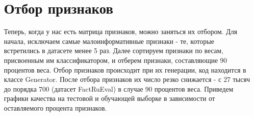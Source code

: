 \section{Отбор признаков}

Теперь, когда у нас есть матрица признаков, можно заняться их отбором. Для начала, исключаем самые малоинформативные признаки - те, которые встретились в датасете менее 5 раз. Далее сортируем признаки по весам, присвоенным им классификатором, и отберем признаки, составляющие 90 процентов веса. Отбор признаков происходит при их генерации, код находится в классе Generator. После отбора признаков их число резко снижается - с 27 тысяч до порядка 700 (датасет FactRuEval) в случае 90 процентов веса. Приведем графики качества на тестовой и обучающей выборке в зависимости от оставляемого процента признаков.